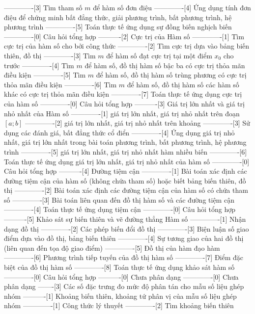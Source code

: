 -------------[3] Tìm tham số $m$ để hàm số đơn điệu
-------------[4] Ứng dụng tính đơn điệu để chứng minh bất đẳng thức, giải phương trình, bất phương trình, hệ phương trình
-------------[5] Toán thực tế ứng dụng sự đồng biến nghịch biến
-------------[0] Câu hỏi tổng hợp
----------[2] Cực trị của Hàm số
-------------[1] Tìm cực trị của hàm số cho bởi công thức
-------------[2] Tìm cực trị dựa vào bảng biến thiên, đồ thị
-------------[3] Tìm $m$ để hàm số đạt cực trị tại một điểm $x_0$ cho trước
-------------[4] Tìm $m$ để hàm số, đồ thị hàm số bậc ba có cực trị thỏa mãn điều kiện
-------------[5] Tìm $m$ để hàm số, đồ thị hàm số trùng phương có cực trị thỏa mãn điều kiện
-------------[6] Tìm $m$ để hàm số, đồ thị hàm số các hàm số khác có cực trị thỏa mãn điều kiện
-------------[7] Toán thực tế ứng dụng cực trị của hàm số
-------------[0] Câu hỏi tổng hợp
----------[3] Giá trị lớn nhất và giá trị nhỏ nhất của Hàm số
-------------[1] giá trị lớn nhất, giá trị nhỏ nhất trên đoạn $[a;b]$
-------------[2] giá trị lớn nhất, giá trị nhỏ nhất trên khoảng
-------------[3] Sử dụng các đánh giá, bất đẳng thức cổ điển
-------------[4] Ứng dụng giá trị nhỏ nhất, giá trị lớn nhất trong bài toán phương trình, bất phương trình, hệ phương trình
-------------[5] giá trị lớn nhất, giá trị nhỏ nhất hàm nhiều biến
-------------[6] Toán thực tế ứng dụng giá trị lớn nhất, giá trị nhỏ nhất của hàm số
-------------[0] Câu hỏi tổng hợp
----------[4] Đường tiệm cận
-------------[1] Bài toán xác định các đường tiệm cận của hàm số (không chứa tham số) hoặc biết bảng biến thiên, đồ thị
-------------[2] Bài toán xác định các đường tiệm cận của hàm số có chứa tham số
-------------[3] Bài toán liên quan đến đồ thị hàm số và các đường tiệm cận
-------------[4] Toán thực tế ứng dụng tiệm cận
-------------[0] Câu hỏi tổng hợp
----------[5] Khảo sát sự biến thiên và vẽ đường thẳng Hàm số
-------------[1] Nhận dạng đồ thị
-------------[2] Các phép biến đổi đồ thị
-------------[3] Biện luận số giao điểm dựa vào đồ thị, bảng biến thiên
-------------[4] Sự tương giao của hai đồ thị (liên quan đến tọa độ giao điểm)
-------------[5] Đồ thị của hàm đạo hàm
-------------[6] Phương trình tiếp tuyến của đồ thị hàm số
-------------[7] Điểm đặc biệt của đồ thị hàm số
-------------[8] Toán thực tế ứng dụng khảo sát hàm số
-------------[0] Câu hỏi tổng hợp
----------[0] Chưa phân dạng
-------------[0] Chưa phân dạng
-------[3] Các số đặc trưng đo mức độ phân tán cho mẫu số liệu ghép nhóm
----------[1] Khoảng biến thiên, khoảng tứ phân vị của mẫu số liệu ghép nhóm
-------------[1] Công thức lý thuyết
-------------[2] Tìm khoảng biến thiên 

